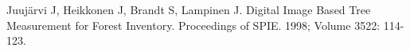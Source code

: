 

\begin{thebibliography}{99}



Juujärvi J, Heikkonen J, Brandt S, Lampinen J. Digital Image Based Tree Measurement for Forest Inventory. Proceedings of SPIE. 1998; Volume 3522: 114-123.

\end{thebibliography}